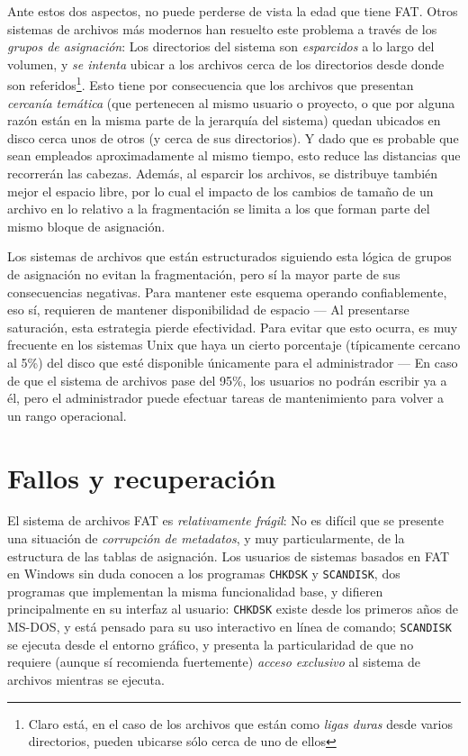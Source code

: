 \documentclass[11pt,fleqn]{book} %
\begin{document}
Ante estos dos aspectos, no puede perderse de vista la edad que tiene
FAT. Otros sistemas de archivos más modernos han resuelto este
problema a través de los \emph{grupos de asignación}: Los directorios del
sistema son \emph{esparcidos} a lo largo del volumen, y \emph{se intenta} ubicar
a los archivos cerca de los directorios desde donde son referidos\footnote{Claro está, en el caso de los archivos que están como \emph{ligas duras}
desde varios directorios, pueden ubicarse sólo cerca de uno de
ellos }. Esto tiene por consecuencia que los archivos que presentan
\emph{cercanía temática} (que pertenecen al mismo usuario o proyecto, o que
por alguna razón están en la misma parte de la jerarquía del sistema)
quedan ubicados en disco cerca unos de otros (y cerca de sus
directorios). Y dado que
es probable que sean empleados aproximadamente al mismo tiempo, esto
reduce las distancias que recorrerán las cabezas. Además, al esparcir
los archivos, se distribuye también mejor el espacio libre, por lo
cual el impacto de los cambios de tamaño de un archivo en lo relativo
a la fragmentación se limita a los que forman parte del mismo bloque
de asignación.

Los sistemas de archivos que están estructurados siguiendo esta lógica
de grupos de asignación no evitan la fragmentación, pero sí la mayor
parte de sus consecuencias negativas. Para mantener este esquema
operando confiablemente, eso sí, requieren de mantener disponibilidad
de espacio — Al presentarse saturación, esta estrategia pierde
efectividad. Para evitar que esto ocurra, es muy frecuente en los
sistemas Unix que haya un cierto porcentaje (típicamente cercano al
5\%) del disco que esté disponible únicamente para el administrador —
En caso de que el sistema de archivos pase del 95\%, los usuarios no
podrán escribir ya a él, pero el administrador puede efectuar tareas
de mantenimiento para volver a un rango operacional.
\section{Fallos y recuperación}
\label{sec-7-3}
\label{FS_fallos_recuperacion}


El sistema de archivos FAT es \emph{relativamente frágil}: No es difícil que se
presente una situación de \emph{corrupción de metadatos}, y muy
particularmente, de la estructura de las tablas de asignación. Los
usuarios de sistemas basados en FAT en Windows sin duda conocen a los
programas \texttt{CHKDSK} y \texttt{SCANDISK}, dos programas que implementan la
misma funcionalidad base, y difieren principalmente en su interfaz al
usuario: \texttt{CHKDSK} existe desde los primeros años de MS-DOS, y está
pensado para su uso interactivo en línea de comando; \texttt{SCANDISK} se
ejecuta desde el entorno gráfico, y presenta la particularidad de que
no requiere (aunque sí recomienda fuertemente) \emph{acceso exclusivo} al
sistema de archivos mientras se ejecuta.
\end{document}
